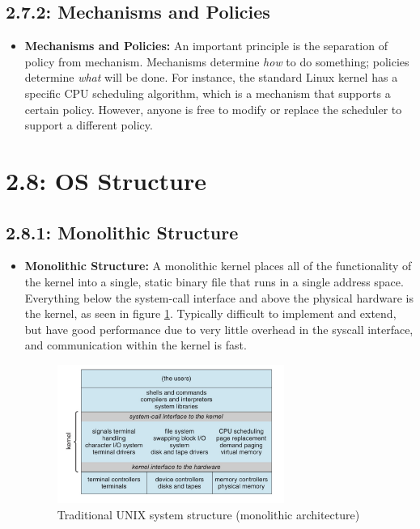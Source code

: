 \documentclass[12pt]{article}
\begin{document}
\subsection*{2.7.2: Mechanisms and Policies}

\begin{itemize}
    \item \textbf{Mechanisms and Policies:} An important principle is the separation of policy from mechanism. Mechanisms determine \textit{how} to do something; policies determine \textit{what} will be done. For instance, the standard Linux kernel has a specific CPU scheduling algorithm, which is a mechanism that supports a certain policy. However, anyone is free to modify or replace the scheduler to support a different policy.
\end{itemize}

\section*{2.8: OS Structure}

\subsection*{2.8.1: Monolithic Structure}

\begin{itemize}
    \item \textbf{Monolithic Structure:} A monolithic kernel places all of the functionality of the kernel into a single, static binary file that runs in a single address space. Everything below the system-call interface and above the physical hardware is the kernel, as seen in figure \ref{fig:monolithic-structure}. Typically difficult to implement and extend, but have good performance due to very little overhead in the syscall interface, and communication within the kernel is fast.
        \begin{figure}[ht]
            \centering
            \includegraphics[width=0.7\textwidth]{figures/monolithic-structure.jpg}
            \caption{Traditional UNIX system structure (monolithic architecture)}
            \label{fig:monolithic-structure}
        \end{figure}
\end{itemize}
\end{document}
